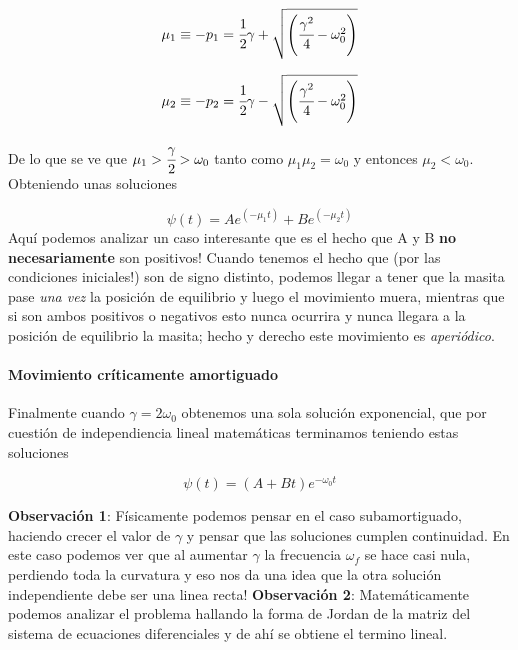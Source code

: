 \documentclass[a4paper,spanish]{article}
\numberwithin{equation}{section}
\begin{document}
\begin{equation*}
\mu_1\equiv -p_1=\cfrac{1}{2}\gamma + \sqrt{\left({\cfrac{\gamma^2}{4}-\omega_0^2}\right)} 
\end{equation*}

\begin{equation*}
\mu_2\equiv -p_2=\cfrac{1}{2}\gamma - \sqrt{\left({\cfrac{\gamma^2}{4}-\omega_0^2}\right)}
\end{equation*}

De lo que se ve que $\mu_1>\cfrac{\gamma}{2}>\omega_0$ tanto como $\mu_1\mu_2=\omega_0$ y entonces $\mu_2<\omega_0$. Obteniendo unas soluciones

    \begin{equation}
        \psi(t) = A e^{(-\mu_1 t)} + B e^{(-\mu_2 t)}
        \label{eq:oscilador_sobreamortiguado_soluciones}
    \end{equation}
 Aqu\'i podemos analizar un caso interesante que es el hecho que A y B \textbf{no necesariamente} son positivos! Cuando tenemos el hecho que (por las condiciones iniciales!) son de signo distinto, podemos llegar a tener que la masita pase \textit{una vez} la posici\'on de equilibrio y luego el movimiento muera, mientras que si son ambos positivos o negativos esto nunca ocurrira y nunca llegara a la posici\'on de equilibrio la masita; hecho y derecho este movimiento es \textit{aperi\'odico}.

\paragraph{Movimiento cr\'iticamente amortiguado}

 Finalmente cuando $\gamma=2\omega_0$ obtenemos una sola soluci\'on exponencial, que por cuesti\'on de independiencia lineal matem\'aticas terminamos teniendo estas soluciones
 
   \begin{equation}
        \psi(t) = (A + B t) e^{-\omega_0 t}
        \label{eq:oscilador_amortiguado_critico}
   \end{equation}
   
\textbf{Observaci\'on 1}: F\'isicamente podemos pensar en el caso subamortiguado, haciendo crecer el valor de $\gamma$ y pensar que las soluciones cumplen continuidad. En este caso podemos ver que al aumentar $\gamma$ la frecuencia $\omega_f$ se hace casi nula, perdiendo toda la curvatura y eso nos da una idea que la otra soluci\'on independiente debe ser una linea recta!
\textbf{Observaci\'on 2}: Matem\'aticamente podemos analizar el problema hallando la forma de Jordan de la matriz del sistema de ecuaciones diferenciales y de ah\'i se obtiene el termino lineal.    
\end{document}
